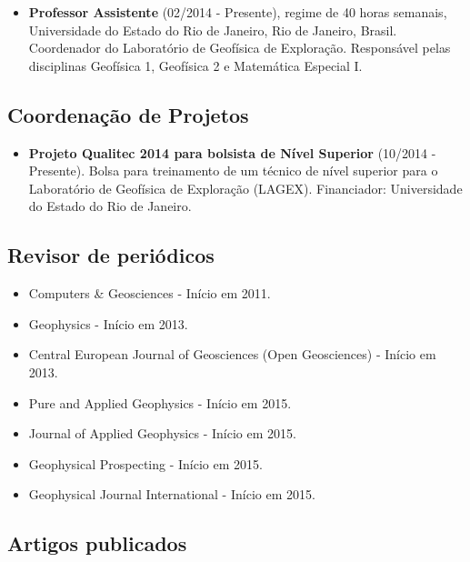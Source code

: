 \begin{itemize}
    \item \textbf{Professor Assistente} (02/2014 - Presente), regime de 40
        horas semanais,
        Universidade do Estado do Rio de Janeiro, Rio de Janeiro, Brasil.
        Coordenador do Laboratório de Geofísica de Exploração. Responsável
        pelas disciplinas Geofísica 1, Geofísica 2 e Matemática Especial I.
\end{itemize}


\subsection{Coordenação de Projetos}

\begin{itemize}
    \item \textbf{Projeto Qualitec 2014 para bolsista de Nível Superior}
        (10/2014 - Presente).
        Bolsa para treinamento de um técnico de nível superior para o
        Laboratório de Geofísica de Exploração (LAGEX).
        Financiador: Universidade do Estado do Rio de Janeiro.
\end{itemize}


\subsection{Revisor de periódicos}

\begin{itemize}
    \item Computers \& Geosciences - Início em 2011.
    \item Geophysics - Início em 2013.
    \item Central European Journal of Geosciences (Open Geosciences) - Início em 2013.
    \item Pure and Applied Geophysics - Início em 2015.
    \item Journal of Applied Geophysics - Início em 2015.
    \item Geophysical Prospecting - Início em 2015.
    \item Geophysical Journal International - Início em 2015.
\end{itemize}

\subsection{Artigos publicados}

